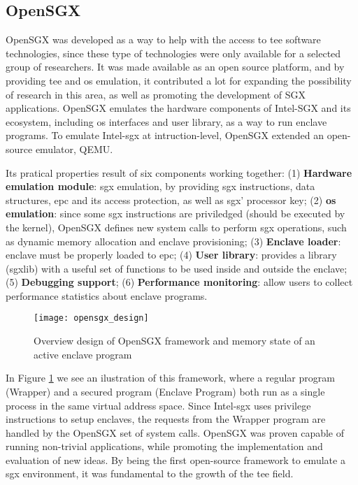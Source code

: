 \subsection{OpenSGX}
\label{ssec:openSGX}

OpenSGX \cite{opensgx_paper} was developed as a way to help with the access to \gls{tee} software technologies, since these type of technologies were only available for a selected group of researchers. 
It was made available as an open source platform, and by providing \gls{tee} and \gls{os} emulation, it contributed a lot for expanding the possibility of research in this area, as well as promoting the development of SGX applications. 
OpenSGX emulates the hardware components of Intel-SGX and its ecosystem, including \gls{os} interfaces and user library, as a way to run enclave programs. To emulate Intel-\gls{sgx} at intruction-level, OpenSGX extended an open-source emulator, QEMU.

Its pratical properties result of six components working together: 
(1) \textbf{Hardware emulation module}: \gls{sgx} emulation, by providing \gls{sgx} instructions, data structures, \gls{epc} and its access protection, as well as \gls{sgx}' processor key; 
(2) \textbf{\gls{os} emulation}: since some \gls{sgx} instructions are priviledged (should be executed by the kernel), OpenSGX defines new system calls to perform \gls{sgx} operations, such as dynamic memory allocation and enclave provisioning; 
(3) \textbf{Enclave loader}: enclave must be properly loaded to \gls{epc}; 
(4) \textbf{User library}: provides a library (sgxlib) with a useful set of functions to be used inside and outside the enclave; 
(5) \textbf{Debugging support}; 
(6) \textbf{Performance monitoring}: allow users to collect performance statistics about enclave programs.

\begin{figure}[htbp]
	\centering
	{\texttt{[image: opensgx\_design]}}
	\caption{Overview design of OpenSGX framework and memory state of an active enclave program}
	\label{fig:openSGXDesign}
\end{figure}

In Figure \ref{fig:openSGXDesign} we see an ilustration of this framework, where a regular program (Wrapper) and a secured program (Enclave Program) both run as a single process in the same virtual address space. Since Intel-\gls{sgx} uses privilege instructions to setup enclaves, the requests from the Wrapper program are handled by the OpenSGX set of system calls.
OpenSGX was proven capable of running non-trivial applications, while promoting the implementation and evaluation of new ideas. By being the first open-source framework to emulate a \gls{sgx} environment, it was  fundamental to the growth of the \gls{tee} field.


